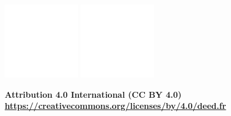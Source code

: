 \documentclass{KBook}
\begin{document}
\begin{tcolorbox}[colback=cyan,
	colframe=cyan,  
	arc=0pt,outer arc=0pt,
	valign=top, 
	halign=center,
	width=\textwidth]
	
	\includegraphics[width=.5cm]{../img/licence/cc_icon_white_x2.png}
	\includegraphics[width=.5cm]{../img/licence/attribution_icon_white_x2.png}
	
	\color{white}
	\bfseries Attribution 4.0 International (CC BY 4.0) \\
	\tiny \url{https://creativecommons.org/licenses/by/4.0/deed.fr}
	
\end{tcolorbox}\vspace{-.5cm}
\end{document}
